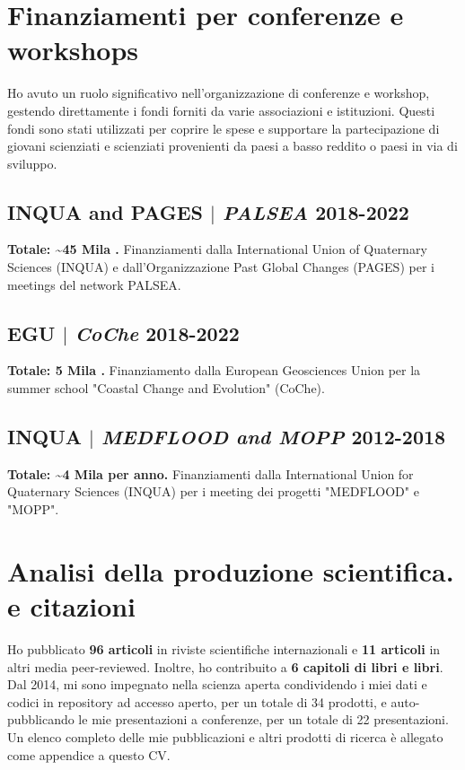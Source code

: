 \documentclass[11pt]{article}
\begin{document}
\section{Finanziamenti per conferenze e workshops}
{\normalfont Ho avuto un ruolo significativo nell'organizzazione di conferenze e workshop, gestendo direttamente i fondi forniti da varie associazioni e istituzioni. Questi fondi sono stati utilizzati per coprire le spese e supportare la partecipazione di giovani scienziati e scienziati provenienti da paesi a basso reddito o paesi in via di sviluppo.}\\

\bigskip

\subsection{INQUA and PAGES $|$ {\normalfont\textit{PALSEA}} \hfill 2018-2022}
{\footnotesize \textbf{Totale: \textasciitilde 45 Mila \texteuro.} Finanziamenti dalla International Union of Quaternary Sciences (INQUA) e dall'Organizzazione Past Global Changes (PAGES) per i meetings del network PALSEA.}
\bigskip

\subsection{EGU $|$ {\normalfont\textit{CoChe}} \hfill 2018-2022}
{\footnotesize \textbf{Totale: 5 Mila \texteuro.} Finanziamento dalla European Geosciences Union per la summer school "Coastal Change and Evolution" (CoChe).}
\bigskip

\subsection{INQUA $|$ {\normalfont\textit{MEDFLOOD and MOPP}} \hfill 2012-2018}
{\footnotesize \textbf{Totale: \textasciitilde 4 Mila \texteuro \space per anno.} Finanziamenti dalla International Union for Quaternary Sciences (INQUA) per i meeting dei progetti "MEDFLOOD" e "MOPP".}
\bigskip

\section{Analisi della produzione scientifica. e citazioni}
\bigskip

{\normalfont Ho pubblicato \textbf{96 articoli} in riviste scientifiche internazionali e \textbf{11 articoli} in altri media peer-reviewed. Inoltre, ho contribuito a \textbf{6 capitoli di libri e libri}. Dal 2014, mi sono impegnato nella scienza aperta condividendo i miei dati e codici in repository ad accesso aperto, per un totale di 34 prodotti, e auto-pubblicando le mie presentazioni a conferenze, per un totale di 22 presentazioni. Un elenco completo delle mie pubblicazioni e altri prodotti di ricerca è allegato come appendice a questo CV.}
\end{document}
